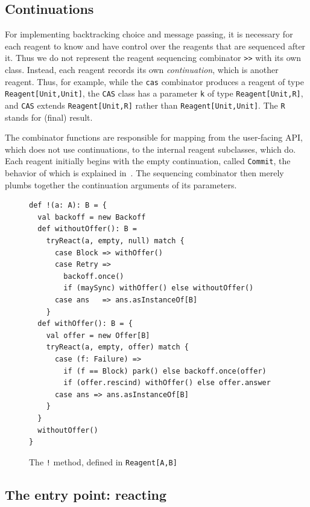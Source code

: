 \documentclass[preprint,nocopyrightspace]{sigplanconf}
\begin{document}

\subsection{Continuations}

For implementing backtracking choice and message passing, it is necessary for
each reagent to know and have control over the reagents that are sequenced after
it.  Thus we do not represent the reagent sequencing combinator \lstinline{>>}
with its own class.  Instead, each reagent records its own \emph{continuation},
which is another reagent.  Thus, for example, while the \lstinline{cas}
combinator produces a reagent of type \lstinline{Reagent[Unit,Unit]}, the
\lstinline{CAS} class has a parameter \lstinline{k} of type
\lstinline{Reagent[Unit,R]}, and \lstinline{CAS} extends
\lstinline{Reagent[Unit,R]} rather than \lstinline{Reagent[Unit,Unit]}.  The
\lstinline{R} stands for (final) result.  

The combinator functions are responsible for mapping from the user-facing API,
which does not use continuations, to the internal reagent subclasses, which do.
Each reagent initially begins with the empty continuation, called
\lstinline{Commit}, the behavior of which is explained in~.
The sequencing combinator then merely plumbs together the continuation arguments
of its parameters.

\begin{figure}
\begin{lstlisting}[frame=single]
def !(a: A): B = {
  val backoff = new Backoff
  def withoutOffer(): B =
    tryReact(a, empty, null) match {
      case Block => withOffer()
      case Retry => 
        backoff.once()
        if (maySync) withOffer() else withoutOffer()
      case ans   => ans.asInstanceOf[B]
    }
  def withOffer(): B = {
    val offer = new Offer[B]
    tryReact(a, empty, offer) match {
      case (f: Failure) => 
        if (f == Block) park() else backoff.once(offer)
        if (offer.rescind) withOffer() else offer.answer
      case ans => ans.asInstanceOf[B]
    }
  }
  withoutOffer()
}
\end{lstlisting}
\nocaptionrule
\caption{The \lstinline{!} method, defined in \lstinline{Reagent[A,B]}}
\label{fig:reaction}
\end{figure}

\subsection{The entry point: reacting}
\label{sec:impl-reaction}
\end{document}
